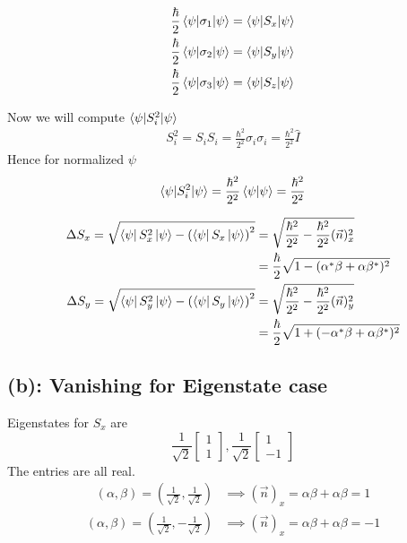 \documentclass[letter, 10pts]{article}
\newcommand{\hb}{\hbar}
\begin{document}
\begin{align*}
\frac{\hb}{2} 	
\braket{\psi | \sigma_1 | \psi } &= 	
\braket{\psi | S_x | \psi}  \\ 
\frac{\hb}{2} 	
\braket{\psi | \sigma_2 | \psi } &= 	
\braket{\psi | S_y | \psi}  \\ 
\frac{\hb}{2} 	
\braket{\psi | \sigma_3 | \psi } &= 	
\braket{\psi | S_z | \psi}  \\ 
\end{align*}

Now we will compute $\braket{\psi | S_i^2 | \psi}$ 
\begin{align*}
	S_i^2 = S_i S_i = \frac{\hb ^2}{2^2} \sigma_i \sigma_i = \frac{\hb^2}{2^2} \hat{I} 
\end{align*}
Hence for normalized $\psi$ 
\[
	\braket{\psi | S_i^2 | \psi} = \frac{\hb^2}{2^2} \braket{\psi | \psi} = \frac{\hb^2}{2^2}
\] 

\begin{align*}
	\Delta S_x =
	\sqrt{
\bra{\psi} S_x^2 \ket{\psi} - 
\left(
\bra{\psi} S_x \ket{\psi} 
\right)^2
	}  &= 
\sqrt{
\frac{\hb^2}{2^2 } - 
\frac{\hb^2}{2^2} (\vec{n})_x  ^2
} 
	\\ 
	&= 
\frac{\hb}{2}
\sqrt{
1 -  ( \alpha ^{*} \beta + \alpha \beta^{*})^2 
} 
	\\
	\Delta S_y =
	\sqrt{
\bra{\psi} S_y^2 \ket{\psi} - 
\left(
\bra{\psi} S_y \ket{\psi} 
\right)^2
	}  &= 
\sqrt{
\frac{\hb^2}{2^2 } - 
\frac{\hb^2}{2^2} (\vec{n})_y  ^2
} 
	\\ 
	&= 
\frac{\hb}{2}
\sqrt{
1 +  ( - \alpha ^{*} \beta + \alpha \beta^{*})^2 
} 
\end{align*}


\subsection*{(b): Vanishing for Eigenstate case}
Eigenstates for $S_x$ are 
\[
\frac{1}{\sqrt{2} } \begin{bmatrix} 1 \\ 1 \end{bmatrix} , 
\frac{1}{\sqrt{2} } \begin{bmatrix} 1 \\ - 1 \end{bmatrix} 
\]
The entries are all real. 
\begin{align*}
	\left(\alpha , \beta\right) = \left(\frac{1}{\sqrt{2} }, \frac{1}{\sqrt{2} }\right) &\implies
	(\vec{n})_x = \alpha \beta + \alpha \beta = 1 
\end{align*}
\begin{align*}
	\left(\alpha , \beta\right) = \left(\frac{1}{\sqrt{2} }, - \frac{1}{\sqrt{2} }\right) &\implies
	(\vec{n})_x = \alpha \beta + \alpha \beta = -1 
\end{align*}
\end{document}
